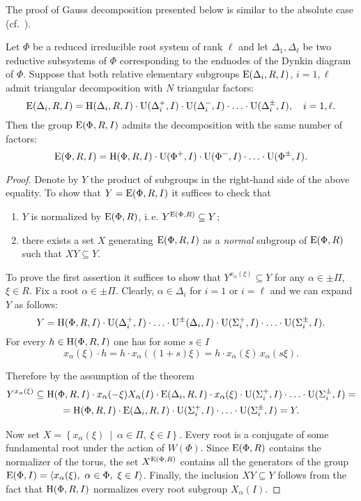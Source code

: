 The proof of Gauss decomposition presented below is similar to the absolute case (cf.~\cite[Theorem~5.1]{Sm12}).

\begin{prop}\label{thm:Gauss}
Let $\Phi$ be a reduced irreducible root system of rank $\ell$ and let $\Delta_1, \Delta_\ell$ be
two reductive subsystems of $\Phi$ corresponding to the endnodes of the Dynkin diagram of $\Phi$.
Suppose that both relative elementary subgroups $\operatorname{E}(\Delta_i, R, I)$, $i=1,\ell$ admit triangular decomposition with $N$ triangular factors:
\[ \operatorname{E}(\Delta_i, R, I) = \operatorname{H}(\Delta_i, R, I) \cdot \operatorname{U}(\Delta^+_i, I) \cdot \operatorname{U}(\Delta^-_i, I) \cdot \ldots \cdot \operatorname{U}(\Delta^\pm_i, I),\quad i=1,\ell. \]
Then the group $\operatorname{E}(\Phi, R, I)$ admits the decomposition with the same number of factors:
\[ \operatorname{E}(\Phi, R, I) = \operatorname{H}(\Phi,R,I) \cdot \operatorname{U}(\Phi^+,I) \cdot \operatorname{U}(\Phi^-, I) \cdot \ldots \cdot \operatorname{U}(\Phi^\pm,I). \]
\end{prop}
\begin{proof}
Denote by $Y$ the product of subgroups in the right-hand side of the above equality.
To show that $Y=\operatorname{E}(\Phi,R,I)$ it suffices to check that
\begin{enumerate}
\item $Y$ is normalized by $\operatorname{E}(\Phi,R)$, i.\,e. $Y^{\operatorname{E}(\Phi,R)}\subseteq Y$;
\item there exists a set $X$ generating $\operatorname{E}(\Phi,R,I)$ as a \emph{normal} subgroup of $\operatorname{E}(\Phi,R)$ such that $XY\subseteq Y$.
\end{enumerate}
To prove the first assertion it suffices to show that $Y^{x_\alpha(\xi)} \subseteq Y$ for any $\alpha\in \pm \Pi$, $\xi\in R$.
Fix a root $\alpha\in\pm\Pi$. Clearly, $\alpha \in \Delta_i$ for $i=1$ or $i=\ell$ and we can expand $Y$ as follows:
\[ Y=\operatorname{H}(\Phi,R,I) \cdot \operatorname{U}(\Delta_i^+,I) \cdot \ldots \cdot \operatorname{U}^\pm(\Delta_i,I) \cdot \operatorname{U}(\Sigma_i^+,I) \cdot \ldots \cdot \operatorname{U}(\Sigma_i^\pm,I). \]
For every  $h \in \operatorname{H}(\Phi, R, I)$ one has for some $s\in I$
\[ x_\alpha(\xi)\cdot h = h\cdot x_\alpha((1+s)\xi)=h\cdot x_\alpha(\xi)\,x_\alpha(s\xi). \]

Therefore by the assumption of the theorem
\begin{multline*}
Y^{x_\alpha(\xi)} \subseteq \operatorname{H}(\Phi,R,I) \cdot x_\alpha(-\xi) X_{\alpha}(I) \cdot \operatorname{E}(\Delta_i,R,I)\cdot x_\alpha(\xi) \cdot \operatorname{U}(\Sigma^+_i,I) \cdot \ldots \cdot \operatorname{U}(\Sigma^\pm_i,I) =\\
= \operatorname{H}(\Phi, R, I) \cdot \operatorname{E}(\Delta_i,R,I) \cdot \operatorname{U}(\Sigma^+_i,I) \cdot \ldots \cdot \operatorname{U}(\Sigma^\pm_i,I) = Y.
\end{multline*}

Now set $X=\left\{x_\alpha(\xi)\ \middle|\ \alpha\in\Pi,\ \xi\in I \right\}$. 
Every root is a conjugate of some fundamental root under the action of $W(\Phi)$.
Since $\operatorname{E}(\Phi,R)$ contains the normalizer of the torus, the set $X^{\operatorname{E}(\Phi,R)}$ contains all the generators of the group $\operatorname{E}(\Phi, I) = \langle x_\alpha(\xi),\  \alpha\in\Phi,\ \xi\in I \rangle$.
Finally, the inclusion $XY \subseteq Y$ follows from the fact that $\operatorname{H}(\Phi,R,I)$ normalizes every root subgroup $X_\alpha(I)$.
\end{proof}

